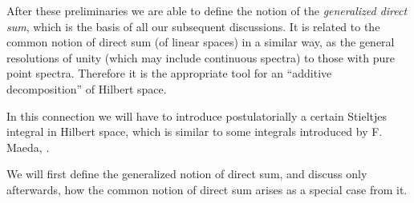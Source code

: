 \documentclass[b5paper,12pt,twoside]{article}
\numberwithin{equation}{section}
\theoremstyle{vnplain}
\theoremstyle{vndefinition}
\begin{document}
After these preliminaries we are able to define the notion of the
\emph{generalized direct sum}, which is the basis of all our subsequent
discussions. It is related to the common notion of direct sum (of linear spaces)
in a similar way, as the general resolutions of unity (which may include
continuous spectra) to those with pure point spectra. Therefore it is the
appropriate tool for an ``additive decomposition'' of Hilbert space.

In this connection we will have to introduce postulatorially a certain Stieltjes
integral in Hilbert space, which is similar to some integrals introduced by F.
Maeda, \cite{ref12}.

We will first define the generalized notion of direct sum, and discuss only
afterwards, how the common notion of direct sum arises as a special case from it.
\end{document}
